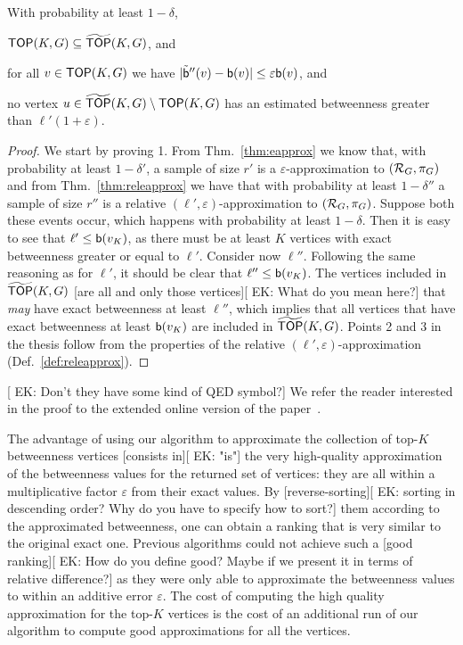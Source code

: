 \begin{lemma}
  With probability at least $1-\delta$, 
  \begin{enumerate*}
    \item $\mathsf{TOP}(K,G)\subseteq \widetilde{\mathsf{TOP}}(K,G)$, and
    \item for all $v\in\mathsf{TOP}(K,G)$ we have
      $|\tilde{\mathsf{b}}''(v)-\mathsf{b}(v)|\le\varepsilon\mathsf{b}(v)$, and
    \item no vertex $u\in\widetilde{\mathsf{TOP}}(K,G)\setminus\mathsf{TOP}(K,G)$ has an estimated
      betweenness greater than $\ell'(1+\varepsilon)$.
  \end{enumerate*}
\end{lemma}
\ifproof
\begin{proof}
  We start by proving 1. From Thm.~\ref{thm:eapprox} we know that, with probability at least
  $1-\delta'$, a sample of size $r'$ is a $\varepsilon$-approximation to
  $(\mathcal{R}_G,\pi_G)$ and from Thm.~\ref{thm:releapprox} we have that with
  probability at least $1-\delta''$ a sample of size $r''$ is a relative
  $(\ell',\varepsilon)$-approximation to $(\mathcal{R}_G,\pi_G)$. Suppose both these
  events occur, which happens with probability at least $1-\delta$. Then it is
  easy to see that $\ell'\le\mathsf{b}(v_K)$, as there must be at least $K$ vertices
  with exact betweenness greater or equal to $\ell'$.  Consider now $\ell''$.
  Following the same reasoning as for $\ell'$, it should be clear that
  $\ell''\le\mathsf{b}(v_K)$. The vertices included in $\widetilde{\mathsf{TOP}}(K,G)$ [are all and
  only those vertices][ EK: What do you mean here?] that \emph{may} have exact betweenness at least $\ell''$,
  which implies that all vertices that have exact betweenness at least
  $\mathsf{b}(v_K)$ are included in $\widetilde{\mathsf{TOP}}(K,G)$. 
  Points 2 and 3 in the thesis follow from the properties of the relative
  $(\ell',\varepsilon)$-approximation (Def.~\ref{def:releapprox}).
\end{proof}
[ EK: Don't they have some kind of QED symbol?]
\else
We refer the reader interested in the proof to the extended online version of
the paper~\citep{RiondatoK13}.
\fi

The advantage of using our algorithm to approximate the collection of top-$K$
betweenness vertices [consists in][ EK: "is"] the very high-quality approximation of the
betweenness values for the returned set of vertices: they are all within a
multiplicative factor $\varepsilon$ from their exact values. By [reverse-sorting][ EK: sorting in descending order? Why do 
you have to specify how to sort?]
them according to the approximated betweenness, one can obtain a ranking that is
very similar to the original exact one. Previous algorithms could not achieve such a
[good ranking][ EK: How do you define good? Maybe if we present it in terms of relative difference?]
as they were only able to approximate the betweenness values to
within an additive error $\varepsilon$. The cost of computing the high quality
approximation for the top-$K$ vertices is the cost of an additional run of our
algorithm to compute good approximations for all the vertices.

